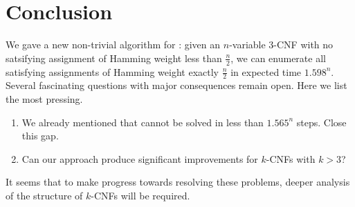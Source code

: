 \section{Conclusion} \label{sec:conclusion}

We gave a new non-trivial algorithm for : given an $n$-variable 3-CNF with no satsifying assignment of Hamming weight less than $\frac{n}{2}$, we can enumerate all satisfying assignments of Hamming weight exactly $\frac{n}{2}$ in expected time $1.598^n$. Several fascinating questions with major consequences remain open. Here we list the most pressing.

\begin{enumerate}
	\item We already mentioned that  cannot be solved in less than $1.565^n$ steps. Close this gap.


	\item Can our approach produce significant improvements for $k$-CNFs with $k>3$?

\end{enumerate}

It seems that to make progress towards resolving these problems, deeper analysis of the structure of $k$-CNFs will be required. 